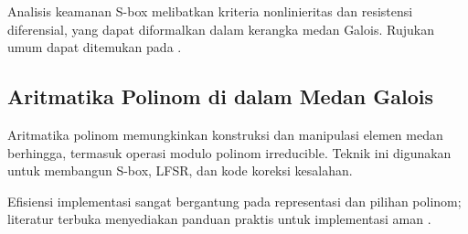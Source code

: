 \documentclass[../main.tex]{subfiles}
\begin{document}
Analisis keamanan S-box melibatkan kriteria nonlinieritas dan resistensi diferensial, yang dapat diformalkan dalam kerangka medan Galois. Rujukan umum dapat ditemukan pada \textcite{menezes1996handbook}.

\subsection{Aritmatika Polinom di dalam Medan Galois}
Aritmatika polinom memungkinkan konstruksi dan manipulasi elemen medan berhingga, termasuk operasi modulo polinom irreducible. Teknik ini digunakan untuk membangun S-box, LFSR, dan kode koreksi kesalahan.

Efisiensi implementasi sangat bergantung pada representasi dan pilihan polinom; literatur terbuka menyediakan panduan praktis untuk implementasi aman \parencite{menezes1996handbook}.
\end{document}

